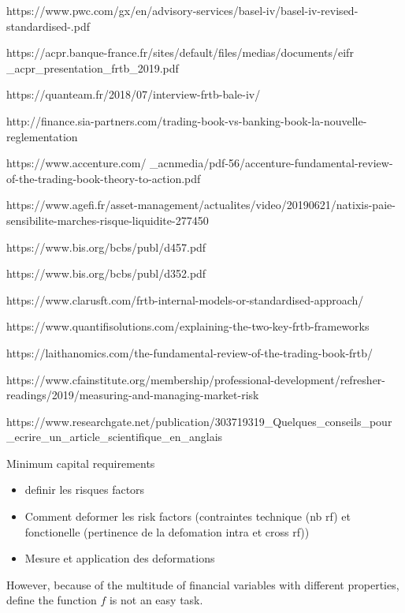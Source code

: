 \documentclass[3pt]{article}
\begin{document}
\bigskip 

\bigskip 

\bigskip
https://www.pwc.com/gx/en/advisory-services/basel-iv/basel-iv-revised-standardised-.pdf

https://acpr.banque-france.fr/sites/default/files/medias/documents/eifr%
\_acpr\_presentation\_frtb\_2019.pdf

https://quanteam.fr/2018/07/interview-frtb-bale-iv/

http://finance.sia-partners.com/trading-book-vs-banking-book-la-nouvelle-reglementation


https://www.accenture.com/%
\_acnmedia/pdf-56/accenture-fundamental-review-of-the-trading-book-theory-to-action.pdf

https://www.agefi.fr/asset-management/actualites/video/20190621/natixis-paie-sensibilite-marches-risque-liquidite-277450

https://www.bis.org/bcbs/publ/d457.pdf

https://www.bis.org/bcbs/publ/d352.pdf

https://www.clarusft.com/frtb-internal-models-or-standardised-approach/

https://www.quantifisolutions.com/explaining-the-two-key-frtb-frameworks

https://laithanomics.com/the-fundamental-review-of-the-trading-book-frtb/

https://www.cfainstitute.org/membership/professional-development/refresher-readings/2019/measuring-and-managing-market-risk

https://www.researchgate.net/publication/303719319\_Quelques\_conseils\_pour%
\_ecrire\_un\_article\_scientifique\_en\_anglais

\bigskip 

\bigskip 

\bigskip Minimum capital requirements

\begin{itemize}
\item definir les risques factors

\item Comment deformer les risk factors (contraintes technique (nb rf) et
fonctionelle (pertinence de la defomation intra et cross rf))

\item Mesure et application des deformations
\end{itemize}

\bigskip

However, because of the multitude of financial variables with different
properties, define the function $f$ is not an easy task.
\end{document}
